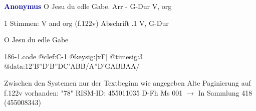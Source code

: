 \documentclass[twocolumn]{book}
\begin{document}
\newline \par \vspace{7pt} \textcolor{darkblue}{\textbf{Anonymus  }}
\newline O Jesu du edle Gabe. Arr - G-Dur
\newline V, org
\newline \begin{itshape}\end{itshape} 
\newline \textcolor{darkblue}{}  1 Stimmen: V and org  (f.122v)
\newline Abschrift
.1  V, G-Dur
\newline \begin{footnotesize} O Jesu du edle Gabe \end{footnotesize}  
\begin{filecontents*}{186-1.code}
@clef:C-1
@keysig:[xF]
@timesig:3
@data:12'B''D'B''DC'ABB/A''D'GABBAA/
\end{filecontents*}
\newline
%
\newline Zwischen den Systemen nur der Textbeginn wie angegeben
\newline Alte Paginierung auf f.122v vorhanden: "78"
\newline RISM-ID: 455011035
\newline D-Fh  Ms 001
\newline $\rightarrow$ In Sammlung 418 (455008343)
      
\end{document}
